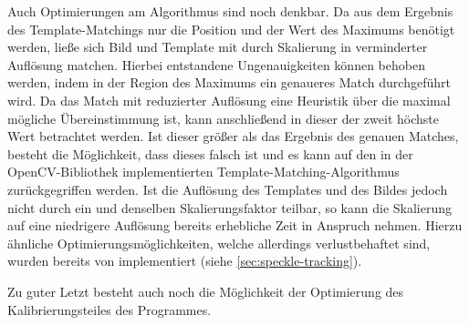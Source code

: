 Auch Optimierungen am Algorithmus sind noch denkbar. Da aus dem Ergebnis des Template-Matchings nur die Position und der Wert des Maximums benötigt werden, ließe sich Bild und Template mit durch Skalierung in verminderter Auflösung matchen. Hierbei entstandene Ungenauigkeiten können behoben werden, indem in der Region des Maximums ein genaueres Match durchgeführt wird. Da das Match mit reduzierter Auflösung eine Heuristik über die maximal mögliche Übereinstimmung ist, kann anschließend in dieser der zweit höchste Wert betrachtet werden. Ist dieser größer als das Ergebnis des genauen Matches, besteht die Möglichkeit, dass dieses falsch ist und es kann auf den in der OpenCV-Bibliothek implementierten Template-Matching-Algorithmus zurückgegriffen werden. Ist die Auflösung des Templates und des Bildes jedoch nicht durch ein und denselben Skalierungsfaktor teilbar, so kann die Skalierung auf eine niedrigere Auflösung bereits erhebliche Zeit in Anspruch nehmen. Hierzu ähnliche Optimierungsmöglichkeiten, welche allerdings verlustbehaftet sind, wurden bereits von \citeauthor{Coj17} implementiert (siehe \ref{sec:speckle-tracking}). 

Zu guter Letzt besteht auch noch die Möglichkeit der Optimierung des Kalibrierungsteiles des Programmes. 